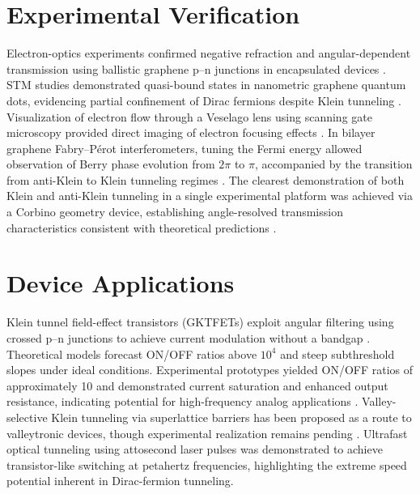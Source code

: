 \documentclass[12pt]{article}
\begin{document}
\section{Experimental Verification}
Electron-optics experiments confirmed negative refraction and angular-dependent transmission using ballistic graphene p–n junctions in encapsulated devices \cite{Chen2016}. STM studies demonstrated quasi-bound states in nanometric graphene quantum dots, evidencing partial confinement of Dirac fermions despite Klein tunneling \cite{Gutierrez2016}. Visualization of electron flow through a Veselago lens using scanning gate microscopy provided direct imaging of electron focusing effects \cite{Brun2019}. In bilayer graphene Fabry–Pérot interferometers, tuning the Fermi energy allowed observation of Berry phase evolution from \(2\pi\) to \(\pi\), accompanied by the transition from anti-Klein to Klein tunneling regimes \cite{Du2018}. The clearest demonstration of both Klein and anti-Klein tunneling in a single experimental platform was achieved via a Corbino geometry device, establishing angle-resolved transmission characteristics consistent with theoretical predictions \cite{Elahi2024}.

\section{Device Applications}
Klein tunnel field-effect transistors (GKTFETs) exploit angular filtering using crossed p–n junctions to achieve current modulation without a bandgap \cite{Tan2017}. Theoretical models forecast ON/OFF ratios above \(10^4\) and steep subthreshold slopes under ideal conditions. Experimental prototypes yielded ON/OFF ratios of approximately 10 and demonstrated current saturation and enhanced output resistance, indicating potential for high-frequency analog applications \cite{Wang2019}. Valley-selective Klein tunneling via superlattice barriers has been proposed as a route to valleytronic devices, though experimental realization remains pending \cite{An2020}. Ultrafast optical tunneling using attosecond laser pulses was demonstrated to achieve transistor-like switching at petahertz frequencies, highlighting the extreme speed potential inherent in Dirac-fermion tunneling.
\end{document}
